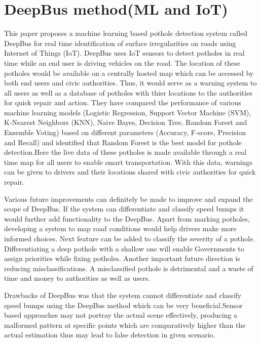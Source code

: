 \section{DeepBus method(ML and IoT) }
This paper proposes a
machine learning based pothole detection system called DeepBus for real time identification of surface irregularities on roads using Internet of Things (IoT)\cite{R21}. DeepBus uses IoT sensors to detect potholes in real time while an end user is driving vehicles on the road. The location of these potholes would be available on a centrally hosted map which can be accessed by both end users and civic authorities. Thus, it would serve as a warning system to all users as well as a database of potholes with thier locations to the authorities for quick repair and action. They have compared the performance of various machine learning models (Logistic Regression, Support Vector Machine (SVM), K-Nearest Neighbors (KNN), Naive Bayes, Decision Tree, Random Forest and Ensemble Voting) based on different parameters (Accuracy, F-score, Precision and Recall) and identified that Random Forest is the best model for pothole detection.Here the live data of these potholes is made available through a real time map for all users to enable smart transportation. With this data, warnings can be given to drivers and their locations shared with civic authorities for quick repair. 





\noindent
Various future improvements can definitely be made to improve and expand the scope of DeepBus. If the system can
differentiate and classify speed bumps it would further add functionality to the DeepBus. Apart from marking potholes,
developing a system to map road conditions would help drivers make more informed choices. Next feature can be added to classify the severity of a pothole. Differentiating a deep pothole with a shallow one will enable Governments to assign priorities while fixing potholes. Another important future direction is reducing misclassifications. A misclassified pothole is detrimental and a waste of time and money to authorities as well as users.

\noindent
 Drawbacks of DeepBus was that the system cannot differentiate and classify speed bumps using the DeepBus method which can be very beneficial.Sensor based approaches may not portray the actual scene effectively, producing a malformed pattern at specific points which are comparatively higher than the actual estimation thus may lead to false detection in given scenario.
